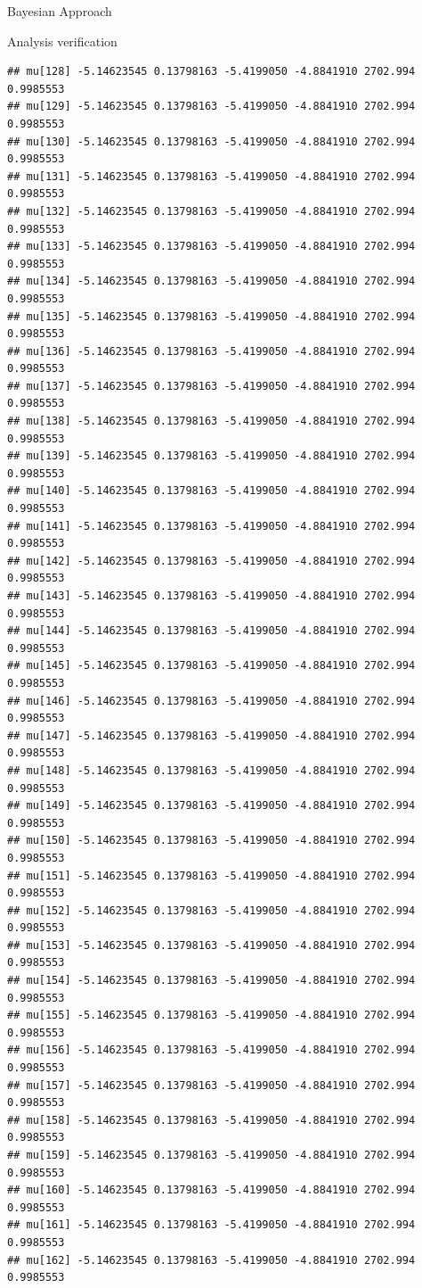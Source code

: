 \documentclass[
  ignorenonframetext,
]{beamer}
\begin{document}
\begin{frame}[fragile]{Bayesian Approach}
\begin{block}{Analysis verification}
\begin{verbatim}
## mu[128] -5.14623545 0.13798163 -5.4199050 -4.8841910 2702.994 0.9985553
## mu[129] -5.14623545 0.13798163 -5.4199050 -4.8841910 2702.994 0.9985553
## mu[130] -5.14623545 0.13798163 -5.4199050 -4.8841910 2702.994 0.9985553
## mu[131] -5.14623545 0.13798163 -5.4199050 -4.8841910 2702.994 0.9985553
## mu[132] -5.14623545 0.13798163 -5.4199050 -4.8841910 2702.994 0.9985553
## mu[133] -5.14623545 0.13798163 -5.4199050 -4.8841910 2702.994 0.9985553
## mu[134] -5.14623545 0.13798163 -5.4199050 -4.8841910 2702.994 0.9985553
## mu[135] -5.14623545 0.13798163 -5.4199050 -4.8841910 2702.994 0.9985553
## mu[136] -5.14623545 0.13798163 -5.4199050 -4.8841910 2702.994 0.9985553
## mu[137] -5.14623545 0.13798163 -5.4199050 -4.8841910 2702.994 0.9985553
## mu[138] -5.14623545 0.13798163 -5.4199050 -4.8841910 2702.994 0.9985553
## mu[139] -5.14623545 0.13798163 -5.4199050 -4.8841910 2702.994 0.9985553
## mu[140] -5.14623545 0.13798163 -5.4199050 -4.8841910 2702.994 0.9985553
## mu[141] -5.14623545 0.13798163 -5.4199050 -4.8841910 2702.994 0.9985553
## mu[142] -5.14623545 0.13798163 -5.4199050 -4.8841910 2702.994 0.9985553
## mu[143] -5.14623545 0.13798163 -5.4199050 -4.8841910 2702.994 0.9985553
## mu[144] -5.14623545 0.13798163 -5.4199050 -4.8841910 2702.994 0.9985553
## mu[145] -5.14623545 0.13798163 -5.4199050 -4.8841910 2702.994 0.9985553
## mu[146] -5.14623545 0.13798163 -5.4199050 -4.8841910 2702.994 0.9985553
## mu[147] -5.14623545 0.13798163 -5.4199050 -4.8841910 2702.994 0.9985553
## mu[148] -5.14623545 0.13798163 -5.4199050 -4.8841910 2702.994 0.9985553
## mu[149] -5.14623545 0.13798163 -5.4199050 -4.8841910 2702.994 0.9985553
## mu[150] -5.14623545 0.13798163 -5.4199050 -4.8841910 2702.994 0.9985553
## mu[151] -5.14623545 0.13798163 -5.4199050 -4.8841910 2702.994 0.9985553
## mu[152] -5.14623545 0.13798163 -5.4199050 -4.8841910 2702.994 0.9985553
## mu[153] -5.14623545 0.13798163 -5.4199050 -4.8841910 2702.994 0.9985553
## mu[154] -5.14623545 0.13798163 -5.4199050 -4.8841910 2702.994 0.9985553
## mu[155] -5.14623545 0.13798163 -5.4199050 -4.8841910 2702.994 0.9985553
## mu[156] -5.14623545 0.13798163 -5.4199050 -4.8841910 2702.994 0.9985553
## mu[157] -5.14623545 0.13798163 -5.4199050 -4.8841910 2702.994 0.9985553
## mu[158] -5.14623545 0.13798163 -5.4199050 -4.8841910 2702.994 0.9985553
## mu[159] -5.14623545 0.13798163 -5.4199050 -4.8841910 2702.994 0.9985553
## mu[160] -5.14623545 0.13798163 -5.4199050 -4.8841910 2702.994 0.9985553
## mu[161] -5.14623545 0.13798163 -5.4199050 -4.8841910 2702.994 0.9985553
## mu[162] -5.14623545 0.13798163 -5.4199050 -4.8841910 2702.994 0.9985553

\end{verbatim}
\end{block}
\end{frame}
\end{document}
